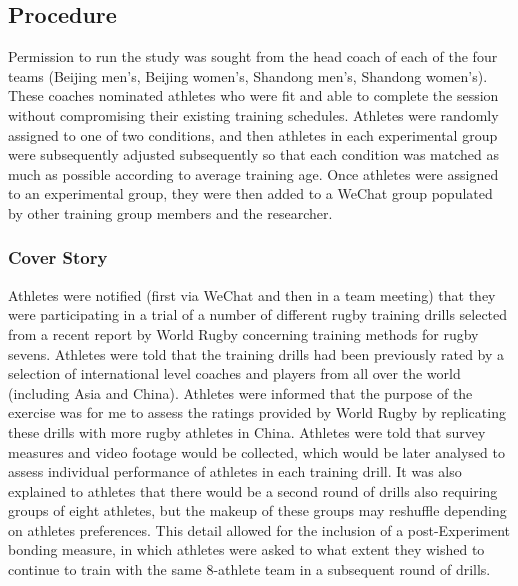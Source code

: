 \subsection{Procedure}
Permission to run the study was sought from the head coach of each of the four teams (Beijing men's, Beijing women's, Shandong men's, Shandong women's).  These coaches nominated athletes who were fit and able to complete the session without compromising their existing training schedules.  Athletes were randomly assigned to one of two conditions, and then athletes in each experimental group were subsequently adjusted subsequently so that each condition was matched as much as possible according to average training age. Once athletes were assigned to an experimental group, they were then added to a WeChat group populated by other training group members and the researcher.

\subsubsection{Cover Story}
Athletes were notified (first via WeChat and then in a team meeting) that they were participating in a trial of a number of different rugby training drills selected from a recent report by World Rugby concerning training methods for rugby sevens.  Athletes were told that the training drills had been previously rated by a selection of international level coaches and players from all over the world (including Asia and China).  Athletes were informed that the purpose of the exercise was for me to assess the ratings provided by World Rugby by replicating these drills with more rugby athletes in China.  Athletes were told that survey measures and video footage would be collected, which would be later analysed to assess individual performance of athletes in each training drill.  It was also explained to athletes that there would be a second round of drills also requiring groups of eight athletes, but the makeup of these groups may reshuffle depending on athletes preferences.  This detail allowed for the inclusion of a post-Experiment bonding measure, in which athletes were asked to what extent they wished to continue to train with the same 8-athlete team in a subsequent round of drills.

